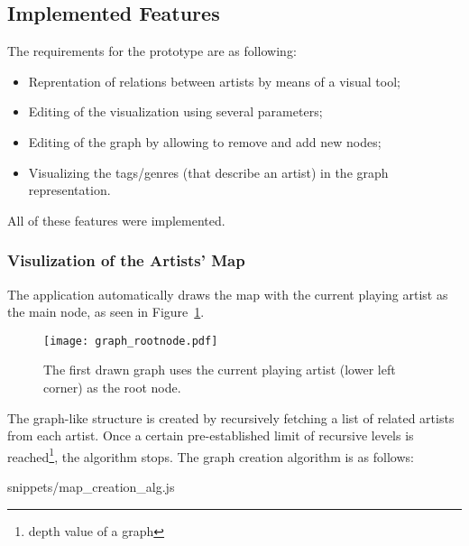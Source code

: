   \subsection{Implemented Features} %
    \label{sub:main_features}
    
    The requirements for the prototype are as following:

    \begin{itemize}
      \item Reprentation of relations between artists by means of a visual tool;
      \item Editing of the visualization using several parameters;
      \item Editing of the graph by allowing to remove and add new nodes;
      \item Visualizing the tags/genres (that describe an artist) in the graph representation.
    \end{itemize}

    All of these features were implemented.

    \subsubsection{Visulization of the Artists' Map} %
      \label{ssub:visualization}
    
      The application automatically draws the map with the current playing artist as the main node, as seen in Figure~\ref{fig:graph_rootnode}.

      \begin{figure}[H]
        \begin{center}
          \texttt{[image: graph\_rootnode.pdf]}
        \end{center}
        \caption{The first drawn graph uses the current playing artist (lower left corner) as the root node.}
        \label{fig:graph_rootnode}
      \end{figure}

      The graph-like structure is created by recursively fetching a list of related artists from each artist. Once a certain pre-established limit of recursive levels is reached\footnote{depth value of a graph}, the algorithm stops.
      The graph creation algorithm is as follows:

      
      {snippets/map_creation_alg.js}

